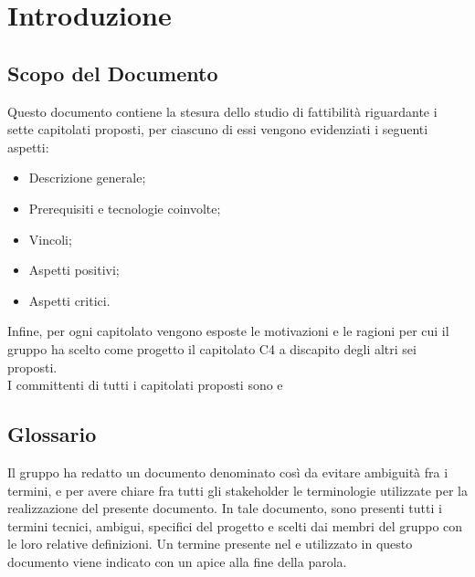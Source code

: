 \section{Introduzione}
\subsection{Scopo del Documento}
Questo documento contiene la stesura dello studio di fattibilità riguardante i sette capitolati proposti, per ciascuno di essi vengono evidenziati i seguenti aspetti:
\begin{itemize}
    \item Descrizione generale;
    \item Prerequisiti e tecnologie coinvolte;
    \item Vincoli;
    \item Aspetti positivi;
    \item Aspetti critici.
\end{itemize}
Infine, per ogni capitolato vengono esposte le motivazioni e le ragioni per cui il gruppo ha scelto come progetto il capitolato C4 \NomeProgetto{} a discapito degli altri sei proposti.\\
I committenti di tutti i capitolati proposti sono \VT{} e \CR{}

\subsection{Glossario}
Il gruppo \Gruppo{} ha redatto un documento denominato  così da evitare ambiguità fra i termini, e per avere chiare fra tutti gli stakeholder le terminologie utilizzate per la realizzazione del presente documento.
In tale documento, sono presenti tutti i termini tecnici, ambigui, specifici del progetto e scelti dai membri del gruppo con le loro relative definizioni.
Un termine presente nel  e utilizzato in questo documento viene indicato con un apice  alla fine della parola.

